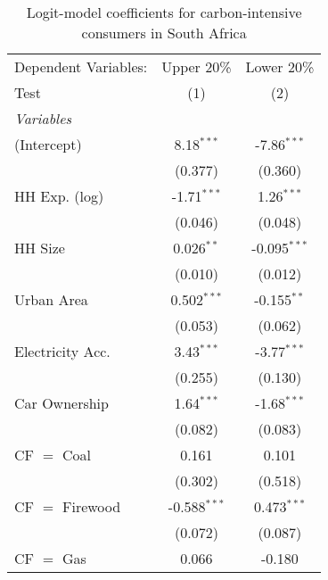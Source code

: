 
\begin{table}[htbp!]
   \centering
   \small
   \begin{adjustbox}{width = 1\textwidth, max height = 0.95\textheight, center}
      \begin{threeparttable}[b]
         \caption{\label{tab:Logit_1_ZAF} Logit-model coefficients for carbon-intensive consumers in South Africa}
         \begin{tabular}{lcc}
            \tabularnewline \midrule \midrule
            Dependent Variables: & Upper 20\%     & Lower 20\%\\   
            Test                 & (1)            & (2)\\  
            \midrule
            \emph{Variables}\\
            (Intercept)          & 8.18$^{***}$   & -7.86$^{***}$\\   
                                 & (0.377)        & (0.360)\\   
            HH Exp. (log)        & -1.71$^{***}$  & 1.26$^{***}$\\   
                                 & (0.046)        & (0.048)\\   
            HH Size              & 0.026$^{**}$   & -0.095$^{***}$\\   
                                 & (0.010)        & (0.012)\\   
            Urban Area           & 0.502$^{***}$  & -0.155$^{**}$\\   
                                 & (0.053)        & (0.062)\\   
            Electricity Acc.     & 3.43$^{***}$   & -3.77$^{***}$\\   
                                 & (0.255)        & (0.130)\\   
            Car Ownership        & 1.64$^{***}$   & -1.68$^{***}$\\   
                                 & (0.082)        & (0.083)\\   
            CF $=$ Coal          & 0.161          & 0.101\\   
                                 & (0.302)        & (0.518)\\   
            CF $=$ Firewood      & -0.588$^{***}$ & 0.473$^{***}$\\   
                                 & (0.072)        & (0.087)\\   
            CF $=$ Gas           & 0.066          & -0.180\\   

\end{tabular}
\end{threeparttable}
\end{adjustbox}
\end{table}

